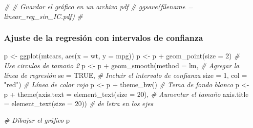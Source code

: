 \documentclass[
  12pt,
]{book}
\newenvironment{Shaded}{\begin{snugshade}}{\end{snugshade}}
\newcommand{\AttributeTok}[1]{\textcolor[rgb]{0.77,0.63,0.00}{#1}}
\newcommand{\CommentTok}[1]{\textcolor[rgb]{0.56,0.35,0.01}{\textit{#1}}}
\newcommand{\ConstantTok}[1]{\textcolor[rgb]{0.00,0.00,0.00}{#1}}
\newcommand{\DecValTok}[1]{\textcolor[rgb]{0.00,0.00,0.81}{#1}}
\newcommand{\FunctionTok}[1]{\textcolor[rgb]{0.00,0.00,0.00}{#1}}
\newcommand{\NormalTok}[1]{#1}
\newcommand{\OtherTok}[1]{\textcolor[rgb]{0.56,0.35,0.01}{#1}}
\newcommand{\SpecialCharTok}[1]{\textcolor[rgb]{0.00,0.00,0.00}{#1}}
\newcommand{\StringTok}[1]{\textcolor[rgb]{0.31,0.60,0.02}{#1}}
\theoremstyle{definition}
\theoremstyle{definition}
\theoremstyle{definition}
\theoremstyle{remark}
\begin{document}
\begin{Shaded}
\begin{Highlighting}[]
\CommentTok{\# \# Guardar el gráfico en un archivo pdf}
\CommentTok{\# ggsave(filename = \textquotesingle{}linear\_reg\_sin\_IC.pdf\textquotesingle{}) \# }
\end{Highlighting}
\end{Shaded}

\hypertarget{ajuste-de-la-regresiuxf3n-con-intervalos-de-confianza}{%
\subsubsection{Ajuste de la regresión con intervalos de confianza}\label{ajuste-de-la-regresiuxf3n-con-intervalos-de-confianza}}

\begin{Shaded}
\begin{Highlighting}[]
\NormalTok{p }\OtherTok{\textless{}{-}} \FunctionTok{ggplot}\NormalTok{(mtcars, }\FunctionTok{aes}\NormalTok{(}\AttributeTok{x =}\NormalTok{ wt, }\AttributeTok{y =}\NormalTok{ mpg)) }
\NormalTok{p }\OtherTok{\textless{}{-}}\NormalTok{ p }\SpecialCharTok{+} \FunctionTok{geom\_point}\NormalTok{(}\AttributeTok{size =} \DecValTok{2}\NormalTok{)       }\CommentTok{\# Use circulos de tamaño 2}
\NormalTok{p }\OtherTok{\textless{}{-}}\NormalTok{ p }\SpecialCharTok{+} \FunctionTok{geom\_smooth}\NormalTok{(}\AttributeTok{method =}\NormalTok{ lm,   }\CommentTok{\# Agregar la línea de regresión }
              \AttributeTok{se =} \ConstantTok{TRUE}\NormalTok{,            }\CommentTok{\# Incluir el intervalo de confianza   }
              \AttributeTok{size =} \DecValTok{1}\NormalTok{,}
              \AttributeTok{col =} \StringTok{"red"}\NormalTok{)          }\CommentTok{\# Línea de color rojo }
\NormalTok{p }\OtherTok{\textless{}{-}}\NormalTok{ p }\SpecialCharTok{+} \FunctionTok{theme\_bw}\NormalTok{()                 }\CommentTok{\# Tema de fondo blanco}
\NormalTok{p }\OtherTok{\textless{}{-}}\NormalTok{ p }\SpecialCharTok{+} \FunctionTok{theme}\NormalTok{(}\AttributeTok{axis.text =} \FunctionTok{element\_text}\NormalTok{(}\AttributeTok{size =} \DecValTok{20}\NormalTok{),  }\CommentTok{\# Aumentar el tamaño }
               \AttributeTok{axis.title =} \FunctionTok{element\_text}\NormalTok{(}\AttributeTok{size =} \DecValTok{20}\NormalTok{)) }\CommentTok{\# de letra en los ejes}

\CommentTok{\# Dibujar el gráfico}
\NormalTok{p   }
\end{Highlighting}
\end{Shaded}
\end{document}
